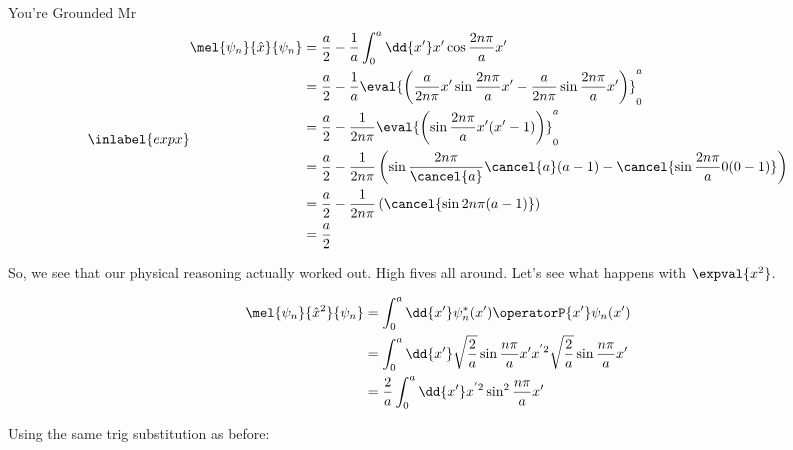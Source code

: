 \begin{answer}
\begin{answerpart}{You're Grounded Mr}
    \begin{equation}
      \inlabel{expx}
      \begin{split}
        \mel{\psi_n}{\hat{x}}{\psi_n}
        &=
        \frac{a}{2}
        -
        \frac{1}{a}
        \int_0^a \dd{x'}
        x'
        \cos{\frac{2n\pi}{a}x'}
        \\
        &=
        \frac{a}{2}
        -
        \frac{1}{a}
        \eval{
        \left(
        \frac{a}{2n\pi}x'\sin{\frac{2n\pi}{a}x'}
        - \frac{a}{2n\pi}\sin{\frac{2n\pi}{a}x'}
        \right)
        }_0^a
        \\
        &=
        \frac{a}{2}
        -
        \frac{1}{2n\pi}
        \eval{
        \left(
        \sin{\frac{2n\pi}{a}x'}(x' - 1)
        \right)
        }_0^a
        \\
        &=
        \frac{a}{2}
        -
        \frac{1}{2n\pi}
        \left(
        \sin{\frac{2n\pi}{\cancel{a}}\cancel{a}}(a - 1)
        - 
        \cancel{\sin{\frac{2n\pi}{a}0}(0 - 1)}
        \right)
        \\
        &=
        \frac{a}{2}
        -
        \frac{1}{2n\pi}
        \left(
        \cancel{\sin{2n\pi}(a - 1)}
        \right)
        \\
        &= \frac{a}{2}\\
      \end{split}
    \end{equation}

    So, we see that our physical reasoning actually worked out.  High
    fives all around.  Let's see what happens with $\expval{x^2}$.

    \begin{equation}
      \begin{split}
        \mel{\psi_n}{\hat{x}^2}{\psi_n}
        &=
        \int_0^a \dd{x'}
        \psi_{n}^{*}(x')
        \operatorP{x'}
        \psi_{n}(x')\\
        &=
        \int_0^a \dd{x'}
        \sqrt{\frac{2}{a}}\sin{\frac{n\pi}{a}x'}
        x^{'2}
        \sqrt{\frac{2}{a}}\sin{\frac{n\pi}{a}x'}
        \\
        &=
        \frac{2}{a}
        \int_0^a \dd{x'}
        x^{'2}
        \sin^2{\frac{n\pi}{a}x'}
        \\
      \end{split}
    \end{equation}

    Using the same trig substitution as before:


\end{answerpart}
\end{answer}
